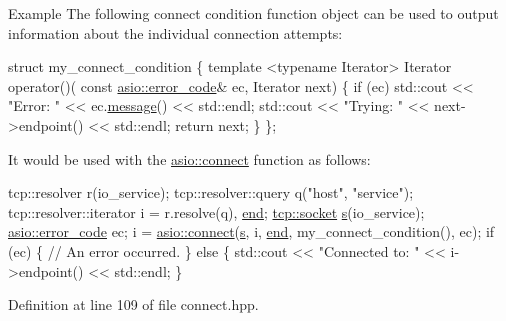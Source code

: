 \begin{DoxyParagraph}{Example}
The following connect condition function object can be used to output information about the individual connection attempts\+: 
\begin{DoxyCode}
 \textcolor{keyword}{struct }my\_connect\_condition
\{
  \textcolor{keyword}{template} <\textcolor{keyword}{typename} Iterator>
  Iterator operator()(
      \textcolor{keyword}{const} \hyperlink{classasio_1_1error__code}{asio::error\_code}& ec,
      Iterator next)
  \{
    \textcolor{keywordflow}{if} (ec) std::cout << \textcolor{stringliteral}{"Error: "} << ec.\hyperlink{classasio_1_1error__code_a9e15b346b9ec23275530835d9c150711}{message}() << std::endl;
    std::cout << \textcolor{stringliteral}{"Trying: "} << next->endpoint() << std::endl;
    \textcolor{keywordflow}{return} next;
  \}
\}; 
\end{DoxyCode}
 It would be used with the \hyperlink{group__connect_ga29acd61d7a875cef7dbd1f892be2906c}{asio\+::connect} function as follows\+: 
\begin{DoxyCode}
 tcp::resolver r(io\_service);
tcp::resolver::query q(\textcolor{stringliteral}{"host"}, \textcolor{stringliteral}{"service"});
tcp::resolver::iterator i = r.resolve(q), \hyperlink{group__async__connect_gadb6ad0193229ae84828688e812cd325c}{end};
\hyperlink{namespacewebsocketpp_1_1transport_1_1asio_1_1socket_1_1error_a828ddaa5ed63a761e1b557465a35f05aa0c31b356014843e1d09514e794a539a7}{tcp::socket} \hyperlink{group__async__connect_ga31ab74b9ea6c77932dddd016cfc7920a}{s}(io\_service);
\hyperlink{classasio_1_1error__code}{asio::error\_code} ec;
i = \hyperlink{group__connect_ga29acd61d7a875cef7dbd1f892be2906c}{asio::connect}(\hyperlink{group__async__connect_ga31ab74b9ea6c77932dddd016cfc7920a}{s}, i, \hyperlink{group__async__connect_gadb6ad0193229ae84828688e812cd325c}{end}, my\_connect\_condition(), ec);
\textcolor{keywordflow}{if} (ec)
\{
  \textcolor{comment}{// An error occurred.}
\}
\textcolor{keywordflow}{else}
\{
  std::cout << \textcolor{stringliteral}{"Connected to: "} << i->endpoint() << std::endl;
\} 
\end{DoxyCode}
 
\end{DoxyParagraph}


Definition at line 109 of file connect.\+hpp.

